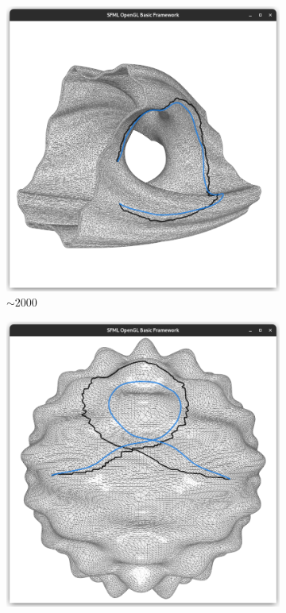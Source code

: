 \documentclass{stdlocal}
\begin{document}
\begin{figure}
  \begin{subfigure}[b]{0.24\linewidth}
    \centering
    \includegraphics[width=\linewidth,trim={25px 20 25 50},clip]{images/julia-smooth-0.5.png}
    \caption{$\sim 2000$}
  \end{subfigure}
  \begin{subfigure}[b]{0.24\linewidth}
    \centering
    \includegraphics[width=\linewidth,trim={25px 20 25 50},clip]{images/harmonic-smooth-0.5.png}

\end{subfigure}
\end{figure}
\end{document}

